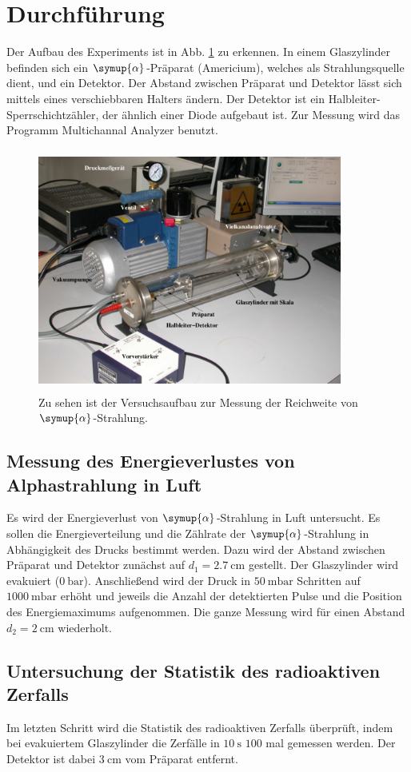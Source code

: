 \section{Durchführung}
\label{sec:Durchführung}

Der Aufbau des Experiments ist in Abb. \ref{fig:aufbau} zu erkennen. In einem Glaszylinder befinden sich ein $\symup{\alpha}$-Präparat (Americium), welches als Strahlungsquelle dient, und ein Detektor. Der Abstand zwischen Präparat und Detektor lässt sich mittels eines verschiebbaren Halters ändern. Der Detektor ist ein Halbleiter-Sperrschichtzähler, der ähnlich einer Diode aufgebaut ist. 
Zur Messung wird das Programm Multichannal Analyzer benutzt. 

\begin{figure}
    \centering
    \includegraphics[width=10cm, height=8cm]{build/aufbau.png}
    \caption{Zu sehen ist der Versuchsaufbau zur Messung der Reichweite von $\symup{\alpha}$-Strahlung. \cite{V701}}
    \label{fig:aufbau}
\end{figure}

\subsection{Messung des Energieverlustes von Alphastrahlung in Luft}
Es wird der Energieverlust von $\symup{\alpha}$-Strahlung in Luft untersucht.
Es sollen die Energieverteilung und die Zählrate der $\symup{\alpha}$-Strahlung in Abhängigkeit des Drucks bestimmt werden.
\newline
Dazu wird der Abstand zwischen Präparat und Detektor zunächst auf $d_1 = \SI{2.7}{\centi\meter}$ gestellt. Der Glaszylinder wird evakuiert ($\SI{0}{\bar}$). Anschließend wird der Druck in $\SI{50}{\milli\bar}$ Schritten auf $\SI{1000}{\milli\bar}$ erhöht und jeweils die Anzahl der detektierten Pulse und die Position des Energiemaximums aufgenommen.
\newline
Die ganze Messung wird für einen Abstand $d_2 = \SI{2}{\centi\meter}$ wiederholt.

\subsection{Untersuchung der Statistik des radioaktiven Zerfalls}
Im letzten Schritt wird die Statistik des radioaktiven Zerfalls überprüft, indem bei evakuiertem Glaszylinder die Zerfälle in $\SI{10}{\second}$ $\num{100}$ mal gemessen werden. Der Detektor ist dabei $\SI{3}{\centi\meter}$ vom Präparat entfernt.